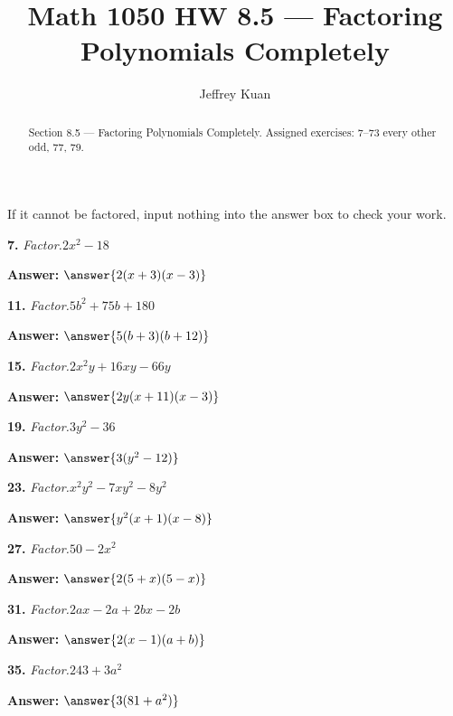 \documentclass{ximera}
\author{Jeffrey Kuan}
\title{Math 1050 HW 8.5 --- Factoring Polynomials Completely}
\begin{document}
\begin{abstract}
    Section 8.5 --- Factoring Polynomials Completely.
    Assigned exercises: 7–73 every other odd, 77, 79.
\end{abstract}

\maketitle

If it cannot be factored, input nothing into the answer box to check your work.

\begin{problem}
\textbf{7.} \emph{Factor.}\quad $2x^2 - 18$

\textbf{Answer:} $\answer{2(x +3)(x -3)}$
\end{problem}

\begin{problem}
\textbf{11.} \emph{Factor.}\quad $5b^2 + 75b + 180$

\textbf{Answer:} $\answer{5(b +3)(b +12)}$
\end{problem}

\begin{problem}
\textbf{15.} \emph{Factor.}\quad $2x^2y + 16xy - 66y$

\textbf{Answer:} $\answer{2y(x +11)(x -3)}$
\end{problem}

\begin{problem}
\textbf{19.} \emph{Factor.}\quad $3y^2 - 36$

\textbf{Answer:} $\answer{3(y^2 -12)}$
\end{problem}

\begin{problem}
\textbf{23.} \emph{Factor.}\quad $x^2y^2 - 7xy^2 - 8y^2$

\textbf{Answer:} $\answer{y^2(x +1)(x -8)}$
\end{problem}

\begin{problem}
\textbf{27.} \emph{Factor.}\quad $50 - 2x^2$

\textbf{Answer:} $\answer{2(5 +x)(5 -x)}$
\end{problem}

\begin{problem}
\textbf{31.} \emph{Factor.}\quad $2ax - 2a + 2bx - 2b$

\textbf{Answer:} $\answer{2(x -1)(a +b)}$
\end{problem}

\begin{problem}
\textbf{35.} \emph{Factor.}\quad $243 + 3a^2$

\textbf{Answer:} $\answer{3(81 +a^2)}$
\end{problem}
\end{document}
